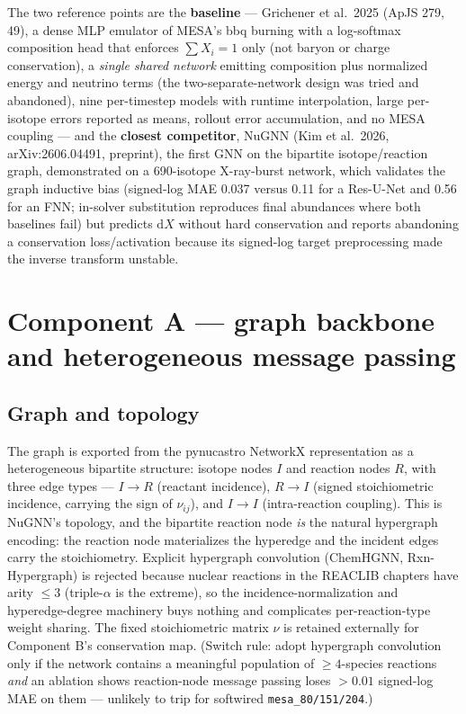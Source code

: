 \documentclass[11pt]{article}
\newcommand{\msn}[1]{\texttt{mesa\_#1}}
\newcommand{\dd}{\mathrm{d}}
\begin{document}
The two reference points are the \textbf{baseline} --- Grichener et al.\ 2025 (ApJS 279, 49), a dense MLP emulator of MESA's bbq burning with a log-softmax composition head that enforces $\sum X_i = 1$ only (not baryon or charge conservation), a \emph{single shared network} emitting composition plus normalized energy and neutrino terms (the two-separate-network design was tried and abandoned), nine per-timestep models with runtime interpolation, large per-isotope errors reported as means, rollout error accumulation, and no MESA coupling --- and the \textbf{closest competitor}, NuGNN (Kim et al.\ 2026, arXiv:2606.04491, preprint), the first GNN on the bipartite isotope/reaction graph, demonstrated on a 690-isotope X-ray-burst network, which validates the graph inductive bias (signed-log MAE 0.037 versus 0.11 for a Res-U-Net and 0.56 for an FNN; in-solver substitution reproduces final abundances where both baselines fail) but predicts $\dd X$ without hard conservation and reports abandoning a conservation loss/activation because its signed-log target preprocessing made the inverse transform unstable.

\section{Component A --- graph backbone and heterogeneous message passing}

\subsection{Graph and topology}

The graph is exported from the pynucastro NetworkX representation as a heterogeneous bipartite structure: isotope nodes $I$ and reaction nodes $R$, with three edge types --- $I\!\to\!R$ (reactant incidence), $R\!\to\!I$ (signed stoichiometric incidence, carrying the sign of $\nu_{ij}$), and $I\!\to\!I$ (intra-reaction coupling). This is NuGNN's topology, and the bipartite reaction node \emph{is} the natural hypergraph encoding: the reaction node materializes the hyperedge and the incident edges carry the stoichiometry. Explicit hypergraph convolution (ChemHGNN, Rxn-Hypergraph) is rejected because nuclear reactions in the REACLIB chapters have arity $\le 3$ (triple-$\alpha$ is the extreme), so the incidence-normalization and hyperedge-degree machinery buys nothing and complicates per-reaction-type weight sharing. The fixed stoichiometric matrix $\nu$ is retained externally for Component B's conservation map. (Switch rule: adopt hypergraph convolution only if the network contains a meaningful population of $\ge 4$-species reactions \emph{and} an ablation shows reaction-node message passing loses $>0.01$ signed-log MAE on them --- unlikely to trip for softwired \msn{80/151/204}.)
\end{document}
